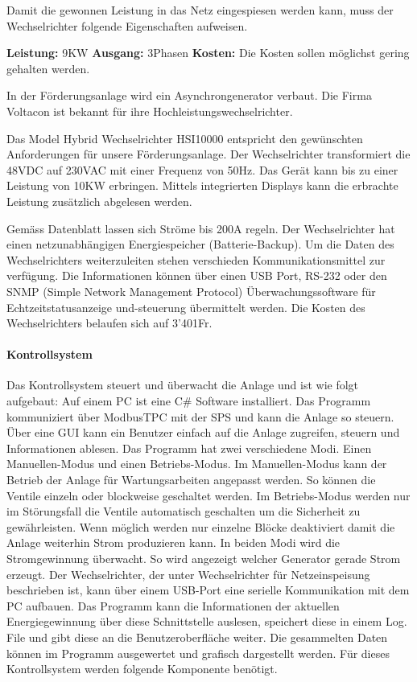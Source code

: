 Damit die gewonnen Leistung in das Netz eingespiesen werden kann, muss der Wechselrichter folgende Eigenschaften aufweisen. 

\textbf{Leistung:}		9KW \newline
\textbf{Ausgang:}		3Phasen \newline
\textbf{Kosten:}		Die Kosten sollen möglichst gering gehalten werden. \newline

In der Förderungsanlage wird ein Asynchrongenerator verbaut. Die Firma Voltacon ist bekannt für ihre Hochleistungswechselrichter.

Das Model Hybrid Wechselrichter HSI10000 entspricht den gewünschten Anforderungen für unsere Förderungsanlage. Der Wechselrichter transformiert die 48VDC auf 230VAC mit einer Frequenz von 50\si{\hertz}. Das Gerät kann bis zu einer Leistung von 10KW erbringen. Mittels integrierten Displays kann die erbrachte Leistung zusätzlich abgelesen werden. 

Gemäss Datenblatt lassen sich Ströme bis 200A regeln. Der Wechselrichter hat einen netzunabhängigen Energiespeicher (Batterie-Backup). Um die Daten des Wechselrichters weiterzuleiten stehen verschieden Kommunikationsmittel zur verfügung. Die Informationen können über einen USB Port, RS-232 oder den SNMP (Simple Network Management Protocol) Überwachungssoftware für Echtzeitstatusanzeige und-steuerung übermittelt werden. Die Kosten des Wechselrichters belaufen sich auf 3'401\si{Fr}.


\paragraph{Kontrollsystem}

Das Kontrollsystem steuert und überwacht die Anlage und ist wie folgt aufgebaut: Auf einem PC ist eine C\# Software installiert. Das Programm kommuniziert über ModbusTPC mit der SPS und kann die Anlage so steuern. Über eine GUI kann ein Benutzer einfach auf die Anlage zugreifen, steuern und Informationen ablesen. Das Programm hat zwei verschiedene Modi. Einen Manuellen-Modus und einen Betriebs-Modus. Im Manuellen-Modus kann der Betrieb der Anlage für Wartungsarbeiten angepasst werden. So können die Ventile einzeln oder blockweise geschaltet werden. Im Betriebs-Modus werden nur im Störungsfall die Ventile automatisch geschalten um die Sicherheit zu gewährleisten. Wenn möglich werden nur einzelne Blöcke deaktiviert damit die Anlage weiterhin Strom produzieren kann. In beiden Modi wird die Stromgewinnung überwacht. So wird angezeigt welcher Generator gerade Strom erzeugt. Der Wechselrichter, der unter Wechselrichter für Netzeinspeisung beschrieben ist, kann über einem USB-Port eine serielle Kommunikation mit dem PC aufbauen. Das Programm kann die Informationen der aktuellen Energiegewinnung über diese Schnittstelle auslesen, speichert diese in einem Log. File und gibt diese an die Benutzeroberfläche weiter. Die gesammelten Daten können im Programm ausgewertet und grafisch dargestellt werden. Für dieses Kontrollsystem werden folgende Komponente benötigt.

